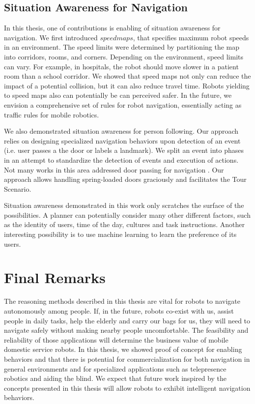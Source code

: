 \subsection{Situation Awareness for Navigation}

In this thesis, one of contributions is enabling of situation awareness for navigation. We first introduced $speed maps$, that specifies maximum robot speeds in an environment. The speed limits were determined by partitioning the map into corridors, rooms, and corners. Depending on the environment, speed limits can vary. For example, in hospitals, the robot should move slower in a patient room than a school corridor. We showed that speed maps not only can reduce the impact of a potential collision, but it can also reduce travel time. Robots yielding to speed maps also can potentially be can perceived safer. In the future, we envision a comprehensive set of rules for robot navigation, essentially acting as traffic rules for mobile robotics.

We also demonstrated situation awareness for person following. Our approach relies on designing specialized navigation behaviors upon detection of an event (i.e. user passes a the door or labels a landmark). We split an event into phases in an attempt to standardize the detection of events and execution of actions. Not many works in this area addressed door passing for navigation \cite{zender2007integrated}. Our approach allows handling spring-loaded doors graciously and facilitates the Tour Scenario.

Situation awareness demonstrated in this work only scratches the surface of the possibilities. A planner can potentially consider many other different factors, such as the identity of users, time of the day, cultures and task instructions. Another interesting possibility is to use machine learning to learn the preference of its users.


\section{Final Remarks}

The reasoning methods described in this thesis are vital for robots to navigate autonomously among people. If, in the future, robots co-exist with us, assist people in daily tasks, help the elderly and carry our bags for us, they will need to navigate safely without making nearby people uncomfortable. The feasibility and reliability of those applications will determine the business value of mobile domestic service robots. In this thesis, we showed proof of concept for enabling behaviors and that there is potential for commercialization for both navigation in general environments and for specialized applications such as telepresence robotics and aiding the blind. We expect that future work inspired by the concepts presented in this thesis will allow robots to exhibit intelligent navigation behaviors.